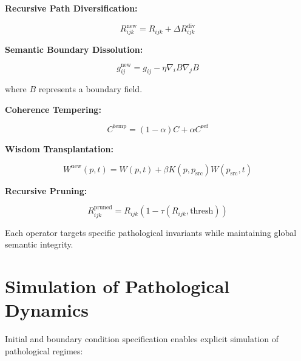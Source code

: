 \textbf{Recursive Path Diversification:}

\begin{equation}
R_{ijk}^{\text{new}} = R_{ijk} + \Delta R_{ijk}^{\text{div}}
\end{equation}

\textbf{Semantic Boundary Dissolution:}

\begin{equation}
g_{ij}^{\text{new}} = g_{ij} - \eta \nabla_i B \nabla_j B
\end{equation}

where $B$ represents a boundary field.

\textbf{Coherence Tempering:}

\begin{equation}
C^{\text{temp}} = (1-\alpha)C + \alpha C^{\text{ref}}
\end{equation}

\textbf{Wisdom Transplantation:}

\begin{equation}
W^{\text{new}}(p,t) = W(p,t) + \beta K(p,p_{\text{src}}) W(p_{\text{src}},t)
\end{equation}

\textbf{Recursive Pruning:}

\begin{equation}
R_{ijk}^{\text{pruned}} = R_{ijk} (1 - \tau(R_{ijk}, \text{thresh}))
\end{equation}

Each operator targets specific pathological invariants while maintaining global semantic integrity.


\section{Simulation of Pathological Dynamics}
\label{16.7:simulation_of_pathological_dynamics}

Initial and boundary condition specification enables explicit simulation of pathological regimes:

